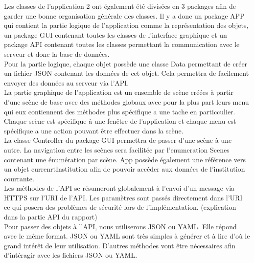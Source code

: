 \documentclass[../rapport.tex]{subfiles}
\begin{document}
Les classes de l'application 2 ont également été divisées en 3 packages afin de garder une bonne organisation générale des classes.
Il y a donc un package APP qui contient la partie logique de l'application comme la représentation des objets, un package GUI contenant toutes les classes de l'interface graphique et un package API contenant toutes les classes permettant la communication avec le serveur et donc la base de données.\\

Pour la partie logique, chaque objet possède une classe Data permettant de créer un fichier JSON contenant les données de cet objet. Cela permettra de facilement envoyer des données au serveur via l'API.\\

La partie graphique de l'application est un ensemble de scène créées à partir d'une scène de base avec des méthodes globaux avec pour la plus part leurs menu qui eux contiennent des méthodes plus spécifique a une tache en particculier. Chaque scène est spécifique à une fenêtre de l'application et chaque menu est spécifique a une action pouvant être effectuer dans la scène.\\
La classe Controller du package GUI permettra de passer d'une scène à une autre. La navigation entre les scènes sera facilitée par l'enumeration Scenes contenant une énumération par scène. App possède également une référence vers un objet currenrtInstitution afin de pouvoir accéder aux données de l'institution courrante.\\

Les méthodes de l'API se résumeront globalement à l'envoi d'un message via HTTPS sur l'URI de l'API. Les paramètres sont passés directement dans l'URI ce qui posera des problèmes de sécurité lors de l'implémentation. (explication dans la partie API du rapport) \\
Pour passer des objets à l'API, nous utiliserons JSON ou YAML. Elle répond avec le même format. JSON ou YAML sont très simples à générer et à lire d'où le grand intérêt de leur utilisation. D'autres méthodes vont être nécessaires afin d'intéragir avec les fichiers JSON ou YAML.\\
\end{document}
